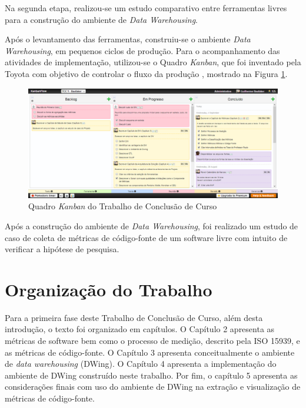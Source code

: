 Na segunda etapa, realizou-se um estudo comparativo entre ferramentas livres para a construção do ambiente de \textit{Data Warehousing}. 

Após o levantamento das ferramentas, construiu-se o ambiente \textit{Data Warehousing}, em pequenos ciclos de produção. Para o acompanhamento das atividades de implementação, utilizou-se o Quadro \textit{Kanban}, que foi inventado pela Toyota com objetivo de controlar o fluxo da produção \cite{moura1999kanban}, mostrado na Figura \ref{kanban}.



\begin{figure}[ht!]
\centering
\includegraphics[bb=0 0 1257 450, scale=0.45]{figuras/kanban.png}
\caption{Quadro \textit{Kanban} do Trabalho de Conclusão de Curso}
         \label{kanban}
\end{figure}
\FloatBarrier

Após a construção do ambiente de \textit{Data Warehousing}, foi realizado um estudo de caso de coleta de métricas de código-fonte de um software livre com intuito de verificar a hipótese de pesquisa.


\section{Organização do Trabalho}

Para a primeira fase deste Trabalho de Conclusão de Curso, além desta 
introdução, o texto foi organizado em capítulos. O Capítulo 2 apresenta as 
métricas de software bem como o processo de medição, descrito pela ISO 15939, 
e as métricas de código-fonte. O Capítulo 3 apresenta conceitualmente o ambiente de \textit{data warehousing} (DWing). O 
Capítulo 4 apresenta a implementação do ambiente de DWing construído neste 
trabalho. Por fim, o capítulo 5 apresenta as considerações finais com uso do 
ambiente de DWing na extração e visualização de métricas de código-fonte. 
